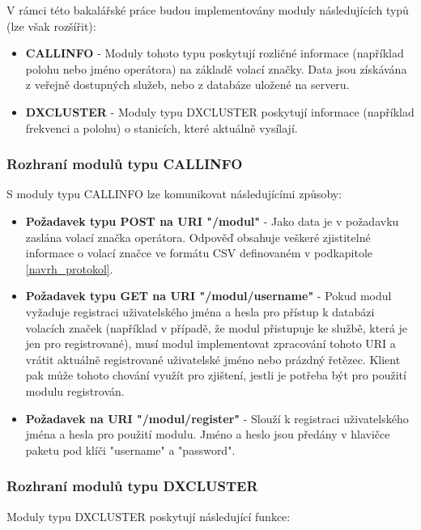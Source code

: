 V rámci této bakalářské práce budou implementovány moduly následujících typů (lze
však rozšířit):

\begin{itemize}
\item \textbf{CALLINFO} - Moduly tohoto typu poskytují rozličné informace (například polohu nebo jméno operátora)
na základě volací značky. Data jsou získávána z veřejně dostupných služeb, nebo z databáze uložené na serveru.
\item \textbf{DXCLUSTER} - Moduly typu DXCLUSTER poskytují informace (například frekvenci a polohu) o stanicích,
které aktuálně vysílají.
\end{itemize}

\subsubsection{Rozhraní modulů typu CALLINFO}

S moduly typu CALLINFO lze komunikovat následujícími způsoby:

\begin{itemize}
\item \textbf{Požadavek typu POST na URI "/modul"} - %
Jako data je v požadavku zaslána volací značka operátora. Odpověď obsahuje
veškeré zjistitelné informace o volací značce ve formátu CSV definovaném v podkapitole \ref{navrh_protokol}.
\item \textbf{Požadavek typu GET na URI "/modul/username"} - %
Pokud modul vyžaduje registraci uživatelského jména a hesla pro
přístup k databázi volacích značek (například v případě, že modul přistupuje ke službě, která je jen pro registrované), musí modul
implementovat zpracování tohoto URI a vrátit aktuálně registrované uživatelské jméno nebo prázdný řetězec. Klient pak může tohoto
chování využít pro zjištení, jestli je potřeba být pro použití modulu registrován.
\item \textbf{Požadavek na URI "/modul/register"} - Slouží k registraci uživatelského jména a hesla pro použití modulu.
Jméno a heslo jsou předány v hlavičce paketu pod klíči "username" a "password".
\end{itemize}

\subsubsection{Rozhraní modulů typu DXCLUSTER}

Moduly typu DXCLUSTER poskytují následující funkce:

